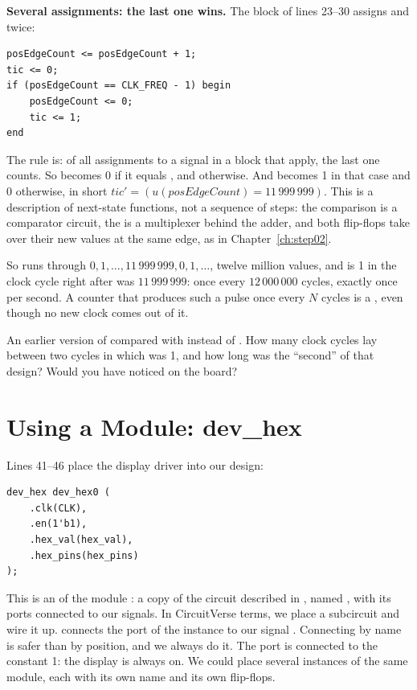 \textbf{Several assignments: the last one wins.} The block of lines 23--30
assigns  and  twice:
\begin{lstlisting}
posEdgeCount <= posEdgeCount + 1;
tic <= 0;
if (posEdgeCount == CLK_FREQ - 1) begin
    posEdgeCount <= 0;
    tic <= 1;
end
\end{lstlisting}
The rule is: of all assignments to a signal in a block that apply, the last
one counts. So  becomes 0 if it equals , and
 otherwise. And  becomes 1 in that case and 0
otherwise, in short $\mathit{tic}' = (u(\mathit{posEdgeCount}) =
11\,999\,999)$. This is a description of next-state functions, not a sequence
of steps: the comparison \cc{==} is a comparator circuit, the  is a
multiplexer behind the adder, and both flip-flops take over their new values
at the same edge, as in Chapter~\ref{ch:step02}.

So  runs through $0, 1, \dots, 11\,999\,999, 0, 1, \dots$,
twelve million values, and  is 1 in the clock cycle right after
 was $11\,999\,999$: once every $12\,000\,000$ cycles,
exactly once per second. A counter that produces such a pulse once every $N$ cycles is
a , even though no new clock comes out of it.

\begin{exercise}
\label{ex:step03-period}
An earlier version of  compared with  instead of
. How many clock cycles lay between two cycles in which
 was 1, and how long was the ``second'' of that design? Would you
have noticed on the board?
\end{exercise}

\section{Using a Module: dev\_hex}
\label{sec:step03-instance}

Lines 41--46 place the display driver into our design:
\begin{lstlisting}
dev_hex dev_hex0 (
    .clk(CLK),
    .en(1'b1),
    .hex_val(hex_val),
    .hex_pins(hex_pins)
);
\end{lstlisting}
This is an  of the module : a copy of the circuit
described in , named , with its ports connected to
our signals. In CircuitVerse terms, we place a subcircuit and wire it up.
 connects the port  of the instance to our signal
. Connecting by name is safer than by position, and we always do it.
The port  is connected to the constant 1: the display is always on. We
could place several instances of the same module, each with its own name and
its own flip-flops.

